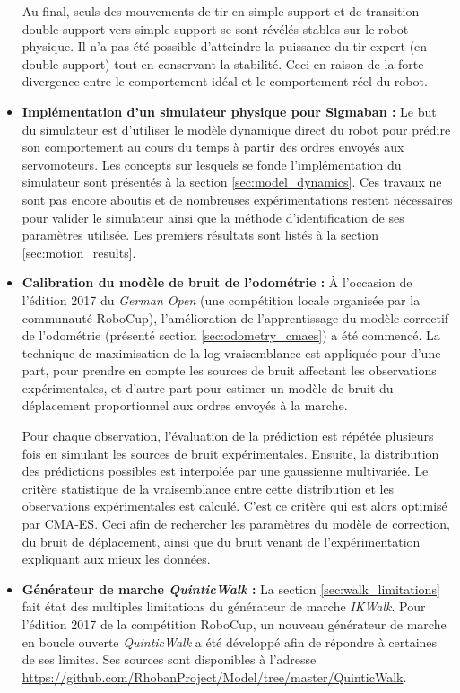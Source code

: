 \begin{itemize}
        Au final, seuls des mouvements de tir en simple support et 
        de transition double support vers simple support se sont révélés
        stables sur le robot physique.
        Il n'a pas été possible d'atteindre la puissance du tir
        expert (en double support) tout en conservant la stabilité.
        Ceci en raison de la forte divergence entre le comportement idéal 
        et le comportement réel du robot.\\
    \item \textbf{Implémentation d'un simulateur physique pour Sigmaban : }
        Le but du simulateur est d'utiliser le modèle dynamique direct du
        robot pour prédire son comportement au cours du temps à partir des
        ordres envoyés aux servomoteurs.
        Les concepts sur lesquels se fonde l'implémentation du simulateur
        sont présentés à la section \ref{sec:model_dynamics}.
        Ces travaux ne sont pas encore aboutis et de nombreuses expérimentations
        restent nécessaires pour valider le simulateur ainsi que la méthode
        d'identification de ses paramètres utilisée.
        Les premiers résultats sont listés à la section \ref{sec:motion_results}.\\
    \item \textbf{Calibration du modèle de bruit de l'odométrie : }
        À l'occasion de l'édition 2017 du \textit{German Open} (une compétition
        locale organisée par la communauté RoboCup), 
        l'amélioration de l'apprentissage du modèle correctif de l'odométrie 
        (présenté section \ref{sec:odometry_cmaes}) a été commencé.
        La technique de maximisation de la log-vraisemblance est appliquée
        pour d'une part, 
        pour prendre en compte les sources de bruit affectant les observations expérimentales, 
        et d'autre part pour estimer un modèle de bruit du déplacement 
        proportionnel aux ordres envoyés à la marche.

        Pour chaque observation, l'évaluation de la prédiction 
        est répétée plusieurs fois en simulant les sources de bruit expérimentales.
        Ensuite, la distribution des prédictions possibles
        est interpolée par une gaussienne multivariée.
        Le critère statistique de la vraisemblance entre cette distribution 
        et les observations expérimentales est calculé.
        C'est ce critère qui est alors optimisé par CMA-ES.
        Ceci afin de rechercher les paramètres du modèle de correction, 
        du bruit de déplacement, ainsi que du bruit venant de l'expérimentation
        expliquant aux mieux les données.\\
    \item \textbf{Générateur de marche \textit{QuinticWalk} : }
        La section \ref{sec:walk_limitations} fait état des multiples limitations
        du générateur de marche \textit{IKWalk}.
        Pour l'édition 2017 de la compétition RoboCup, un nouveau générateur de marche
        en boucle ouverte \textit{QuinticWalk} a été développé afin de répondre
        à certaines de ses limites. Ses sources sont disponibles à l'adresse 
        \url{https://github.com/RhobanProject/Model/tree/master/QuinticWalk}.


\end{itemize}
